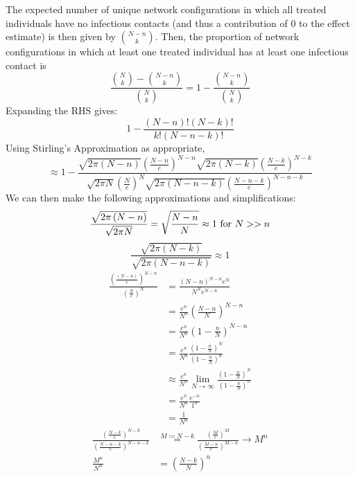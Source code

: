 \documentclass{article}
\theoremstyle{definition}
\begin{document}
The expected number of unique network configurations in which all treated individuals have no infectious contacts (and thus a contribution of 0 to the effect estimate) is then given by $N-n\choose k$. Then, the proportion of network configurations in which at least one treated individual has at least one infectious contact is 
\begin{equation} 
\frac{{N \choose k}-{N-n \choose k}}{{N \choose k}}=1-\frac{{N-n \choose k}}{{N \choose k}}    
\end{equation}
Expanding the RHS gives:
\begin{equation}
1-\frac{\left(N-n\right)!\left(N-k\right)!}{k!\left(N-n-k\right)!}
\end{equation}
Using Stirling's Approximation as appropriate,
\begin{equation}
\approx 1-\frac{\sqrt{2\pi\left(N-n\right)}\left(\frac{N-n}{e}\right)^{N-n}\sqrt{2\pi\left(N-k\right)}\left(\frac{N-k}{e}\right)^{N-k}}{\sqrt{2\pi N}\left(\frac{N}{e}\right)^{N}\sqrt{2\pi \left(N-n-k\right)}\left(\frac{N-n-k}{e}\right)^{N-n-k}}    
\end{equation}
We can then make the following approximations and simplifications:
\begin{equation}
    \frac{\sqrt{2\pi \left(N-n\right)}}{\sqrt{2\pi N}}=\sqrt{\frac{N-n}{N}}\approx 1 \text{ for } N>>n\\
    \end{equation}
    \begin{equation}
    \frac{\sqrt{2 \pi \left(N-k\right)}}{\sqrt{2 \pi \left(N-n-k\right)}}\approx 1
\end{equation}
    \begin{align}
    \frac{\left(\frac{\left(N-n\right)}{e}\right)^{N-n}}{{\left(\frac{N}{e}\right)^{N}}}&=\frac{\left(N-n\right)^{N-n}e^{N}}{N^{N}e^{N-n}}\\
     &=\frac{e^{n}}{N^{n}}\left(\frac{N-n}{N}\right)^{N-n}\\
     &=\frac{e^{n}}{N^{n}}\left(1-\frac{n}{N}\right)^{N-n}\\
     &=\frac{e^{n}}{N^{n}}\frac{\left(1-\frac{n}{N}\right)^{N}}{\left(1-\frac{n}{N}\right)^{n}}\\
     &\approx \frac{e^{n}}{N^{n}}\lim_{N \to \infty}\frac{\left(1-\frac{n}{N}\right)^{N}}{\left(1-\frac{n}{N}\right)^{n}}\\
     &=\frac{e^{n}}{N^{n}}\frac{e^{-n}}{1^{n}}\\
     &=\frac{1}{N^{n}}
\end{align}
\begin{align}
    \frac{\left(\frac{N-k}{e}\right)^{N-k}}{\left(\frac{N-n-k}{e}\right)^{N-n-k}}&\stackrel{M\coloneqq N-k}{=}\frac{\left(\frac{M}{e}\right)^{M}}{\left(\frac{M-n}{e}\right)^{M-n}}\to M^{n}\\
    \frac{M^{n}}{N^{n}}&=\left(\frac{N-k}{N}\right)^{n}
\end{align}
\end{document}
